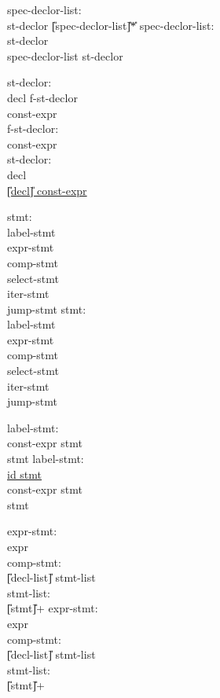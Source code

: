 \begin{center}
\PAIR
{
spec-declor-list: \\
\>	st-declor \U{[}\T{,}spec-declor-list\U{]}\U{*} 
}
{
spec-declor-list: \\
\>	st-declor \\
\>	spec-declor-list \T{,} st-declor 
}

\PAIR
{
st-declor: \\
\>	decl f-st-declor \\
\>	\T{:} const-expr \\
f-st-declor: \\
\>	\T{:} const-expr \\
\>	 
}
{
st-declor: \\
\>	decl \\
\>	\underline{\U{[}decl\U{]} \T{:} const-expr }
}

\PAIR
{
stmt:\\
\>	label-stmt\\
\>	expr-stmt\\
\>	comp-stmt\\
\>	select-stmt\\
\>	iter-stmt\\
\>	jump-stmt
}
{
stmt:\\
\>	label-stmt\\
\>	expr-stmt\\
\>	comp-stmt\\
\>	select-stmt\\
\>	iter-stmt\\
\>	jump-stmt
}

\PAIR
{
label-stmt:\\
\>	 const-expr \T{:} stmt\\
\>	 \T{:} stmt
}
{
label-stmt:\\
\>	\underline{id \T{:} stmt}\\
\>	 const-expr \T{:} stmt\\
\>	 \T{:} stmt
}


\PAIR
{
expr-stmt:\\
\>	expr \T{;}\\
comp-stmt:\\
\>	\T{\{} \U{[}decl-list\U{]} stmt-list \T{\}}\\
stmt-list:\\
\>	\U{[}stmt\U{]}+	
}
{
expr-stmt:\\
\>	expr \T{;}\\
comp-stmt:\\
\>	\T{\{} \U{[}decl-list\U{]} stmt-list \T{\}}\\
stmt-list:\\
\>	\U{[}stmt\U{]}+	
}





\end{center}
